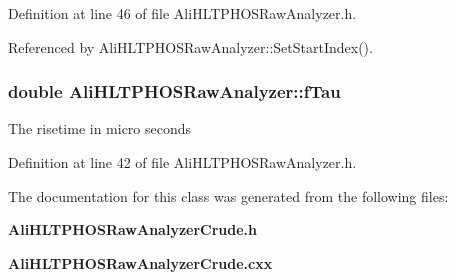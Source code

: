 Definition at line 46 of file Ali\-HLTPHOSRaw\-Analyzer.h.

Referenced by Ali\-HLTPHOSRaw\-Analyzer::Set\-Start\-Index().
\subsubsection{\setlength{\rightskip}{0pt plus 5cm}double {\bf Ali\-HLTPHOSRaw\-Analyzer::f\-Tau}\hspace{0.3cm}{\tt  [protected, inherited]}}\label{classAliHLTPHOSRawAnalyzer_AliHLTPHOSRawAnalyzerPeakFinderp4}


The risetime in micro seconds 

Definition at line 42 of file Ali\-HLTPHOSRaw\-Analyzer.h.

The documentation for this class was generated from the following files:\begin{CompactItemize}
\item 
{\bf Ali\-HLTPHOSRaw\-Analyzer\-Crude.h}\item 
{\bf Ali\-HLTPHOSRaw\-Analyzer\-Crude.cxx}\end{CompactItemize}
